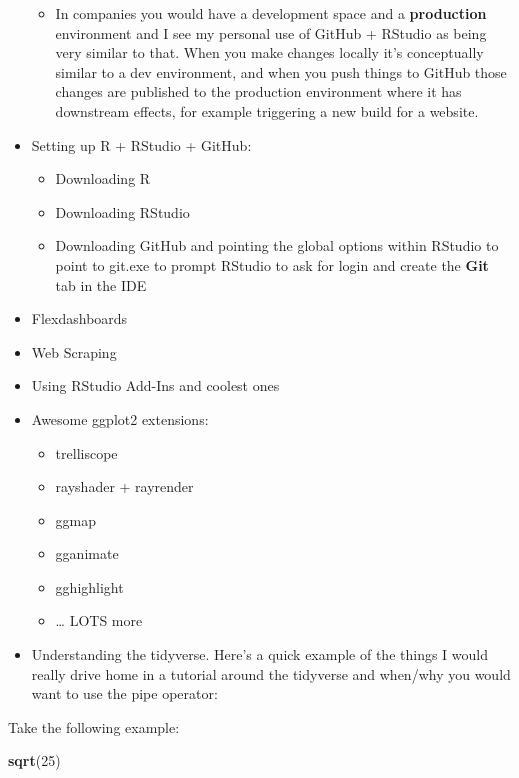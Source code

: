\documentclass[
]{book}
\newenvironment{Shaded}{\begin{snugshade}}{\end{snugshade}}
\newcommand{\DecValTok}[1]{\textcolor[rgb]{0.00,0.00,0.81}{#1}}
\newcommand{\KeywordTok}[1]{\textcolor[rgb]{0.13,0.29,0.53}{\textbf{#1}}}
\newcommand{\NormalTok}[1]{#1}
\providecommand{\tightlist}{%
  \setlength{\itemsep}{0pt}\setlength{\parskip}{0pt}}
\begin{document}
\begin{itemize}
  \begin{itemize}
  \tightlist
  \item
    In companies you would have a development space and a \textbf{production} environment and I see my personal use of GitHub + RStudio as being very similar to that. When you make changes locally it's conceptually similar to a dev environment, and when you push things to GitHub those changes are published to the production environment where it has downstream effects, for example triggering a new build for a website.
  \end{itemize}
\item
  Setting up R + RStudio + GitHub:

  \begin{itemize}
  \item
    Downloading R
  \item
    Downloading RStudio
  \item
    Downloading GitHub and pointing the global options within RStudio to point to git.exe to prompt RStudio to ask for login and create the \textbf{Git} tab in the IDE
  \end{itemize}
\item
  Flexdashboards
\item
  Web Scraping
\item
  Using RStudio Add-Ins and coolest ones
\item
  Awesome ggplot2 extensions:

  \begin{itemize}
  \item
    trelliscope
  \item
    rayshader + rayrender
  \item
    ggmap
  \item
    gganimate
  \item
    gghighlight
  \item
    \ldots{} LOTS more
  \end{itemize}
\item
  Understanding the tidyverse. Here's a quick example of the things I would really drive home in a tutorial around the tidyverse and when/why you would want to use the pipe operator:
\end{itemize}

Take the following example:

\begin{Shaded}
\begin{Highlighting}[]
\KeywordTok{sqrt}\NormalTok{(}\DecValTok{25}\NormalTok{)}
\end{Highlighting}
\end{Shaded}
\end{document}
